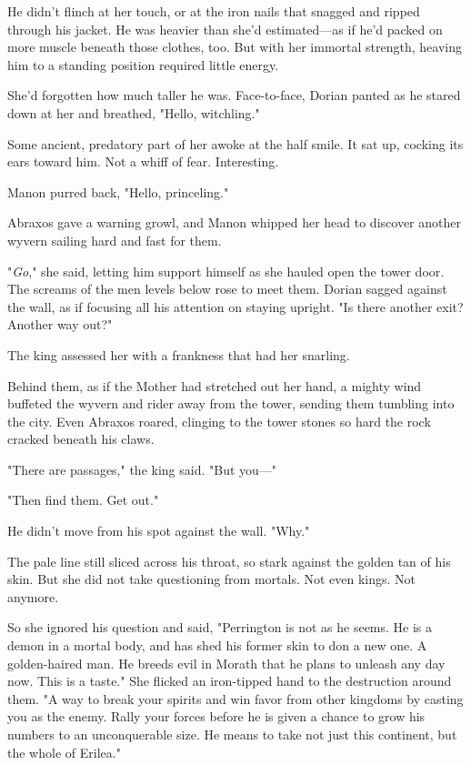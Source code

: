 He didn't flinch at her touch, or at the iron nails that snagged and ripped through his jacket.
He was heavier than she'd estimated---as if he'd packed on more muscle beneath those clothes, too.
But with her immortal strength, heaving him to a standing position required little energy.

She'd forgotten how much taller he was.
Face-to-face, Dorian panted as he stared down at her and breathed, "Hello, witchling."

Some ancient, predatory part of her awoke at the half smile.
It sat up, cocking its ears toward him.
Not a whiff of fear.
Interesting.

Manon purred back, "Hello, princeling."

Abraxos gave a warning growl, and Manon whipped her head to discover another wyvern sailing hard and fast for them.

"\emph{Go}," she said, letting him support himself as she hauled open the tower door.
The screams of the men levels below rose to meet them.
Dorian sagged against the wall, as if focusing all his attention on staying upright.
"Is there another exit?
Another way out?"

The king assessed her with a frankness that had her snarling.

Behind them, as if the Mother had stretched out her hand, a mighty wind buffeted the wyvern and rider away from the tower, sending them tumbling into the city.
Even Abraxos roared, clinging to the tower stones so hard the rock cracked beneath his claws.

"There are passages," the king said.
"But you---"

"Then find them.
Get out."

He didn't move from his spot against the wall.
"Why."

The pale line still sliced across his throat, so stark against the golden tan of his skin.
But she did not take questioning from mortals.
Not even kings.
Not anymore.

So she ignored his question and said, "Perrington is not as he seems.
He is a demon in a mortal body, and has shed his former skin to don a new one.
A golden-haired man.
He breeds evil in Morath that he plans to unleash any day now.
This is a taste."
She flicked an iron-tipped hand to the destruction around them.
"A way to break your spirits and win favor from other kingdoms by casting you as the enemy.
Rally your forces before he is given a chance to grow his numbers to an unconquerable size.
He means to take not just this continent, but the whole of Erilea."

